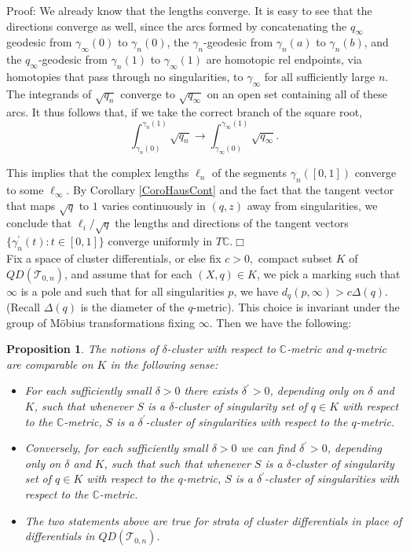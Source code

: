 \documentclass[12pt]{article}
\newtheorem{proposition}[theorem]{Proposition}
\newcommand{\cc}{\mathbb{C}}
\begin{document}
\noindent Proof: We already know that the lengths converge. It is easy to see that the directions converge as well, since the arcs formed by concatenating the $q_\infty$ geodesic from $\gamma_\infty(0)$ to $\gamma_n(0)$, the $\gamma_n$-geodesic from $\gamma_n(a)$ to $\gamma_n(b)$, and the $q_\infty$-geodesic from $\gamma_n(1)$ to $\gamma_\infty(1)$ are homotopic rel endpoints, via homotopies that pass through no singularities, to $\gamma_\infty$ for all sufficiently large $n$. The integrands of $\sqrt{q_n}$ converge to $\sqrt{q_\infty}$ on an open set containing all of these arcs. It thus follows that, if we take the correct branch of the square root, $$\int_{\gamma_n(0)}^{\gamma_n(1)}\sqrt{q_n} \to \int_{\gamma_\infty(0)}^{\gamma_\infty(1)}\sqrt{q_\infty}.$$

\noindent This implies that the complex lengths $\ell_n$ of the segments $\gamma_n([0,1])$ converge to some $\ell_\infty$. By Corollary \ref{CoroHausCont} and the fact that the tangent vector that maps $\sqrt{q}$ to $1$ varies continuously in $(q,z)$ away from singularities, we conclude that $\ell_i/\sqrt{q}$ the lengths and directions of the tangent vectors $\{\gamma_n^\prime(t): t \in [0,1]\}$ converge uniformly in $T\cc$.$\Box$\\

\noindent Fix a space of cluster differentials, or else fix $c > 0,$ compact subset $K$ of $QD(\mathcal{T}_{0,n})$, and assume that for each $(X,q) \in K$, we pick a marking such that $\infty$ is a pole and such that for all singularities $p$, we have $d_q(p,\infty) > c\Delta(q)$. (Recall $\Delta(q)$ is the diameter of the $q$-metric). This choice is invariant under the group of M\"obius transformations fixing $\infty$. Then we have the following:

\begin{proposition}\label{PropVanishInEither} The notions of $\delta$-cluster with respect to $\cc$-metric and $q$-metric are comparable on $K$ in the following sense:
\begin{itemize}
\item For each sufficiently small $\delta > 0$ there exists $\delta^\prime > 0$, depending only on $\delta$ and $K$, such that whenever $S$ is a $\delta$-cluster of singularity set of $q \in K$ with respect to the $\cc$-metric, $S$ is a $\delta^\prime$-cluster of singularities with respect to the $q$-metric.\\
\item Conversely, for each sufficiently small $\delta > 0$ we can find $\delta^\prime > 0$, depending only on $\delta$ and $K$, such that such that whenever $S$ is a $\delta$-cluster of singularity set of $q \in K$ with respect to the $q$-metric, $S$ is a $\delta^\prime$-cluster of singularities with respect to the $\cc$-metric.\\
\item The two statements above are true for strata of cluster differentials in place of differentials in $QD(\mathcal{T}_{0,n})$.
\end{itemize}
\end{proposition}
\end{document}
